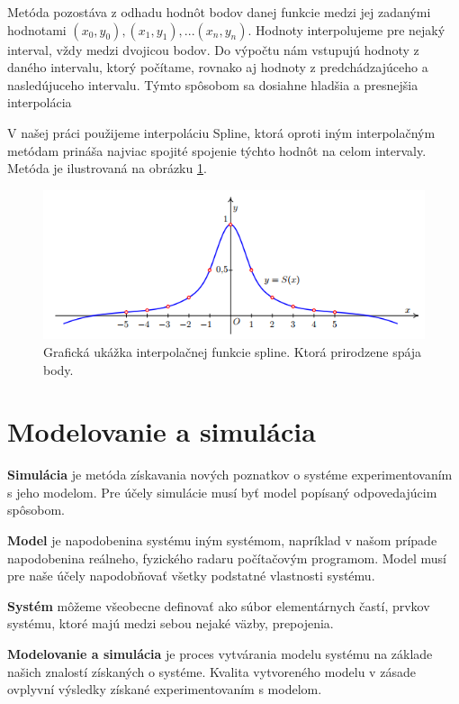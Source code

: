     Metóda pozostáva z odhadu hodnôt bodov danej funkcie medzi jej zadanými hodnotami $(x_{0}, y_{0}), (x_{1}, y_{1}), ... (x_{n}, y_{n})$. Hodnoty interpolujeme pre nejaký interval, vždy medzi dvojicou bodov. Do výpočtu nám vstupujú hodnoty z daného intervalu, ktorý počítame, rovnako aj hodnoty z predchádzajúceho a nasledújuceho intervalu. Týmto spôsobom sa dosiahne hladšia a presnejšia interpolácia

    V našej práci použijeme interpoláciu Spline, ktorá oproti iným interpolačným metódam prináša najviac spojité spojenie týchto hodnôt na celom intervaly. Metóda je ilustrovaná na obrázku \ref{fig:spline}. \cite{inmopora}
    \begin{figure}[h!]
        \centering
        \includegraphics[width=.85\textwidth]{obrazky-figures/spline.png}
        \caption{Grafická ukážka interpolačnej funkcie spline. Ktorá prirodzene spája body\cite{inmopora}.}
        \label{fig:spline}
    \end{figure}        

\section{Modelovanie a simulácia}

  \hspace{0.6cm}\textbf{Simulácia} je metóda získavania nových poznatkov o systéme experimentovaním s jeho modelom. Pre účely simulácie musí byť model popísaný odpovedajúcim spôsobom.

  \textbf{Model} je napodobenina systému iným systémom, napríklad v našom prípade napodobenina reálneho, fyzického radaru počítačovým programom. Model musí pre naše účely napodobňovať všetky podstatné vlastnosti systému.

  \textbf{Systém} môžeme všeobecne definovať ako súbor elementárnych častí, prvkov systému, ktoré majú medzi sebou nejaké väzby, prepojenia.

  \textbf{Modelovanie a simulácia} je proces vytvárania modelu systému na základe našich znalostí získaných o systéme. Kvalita vytvoreného modelu v zásade ovplyvní výsledky získané experimentovaním s modelom.\cite{imsopora}

